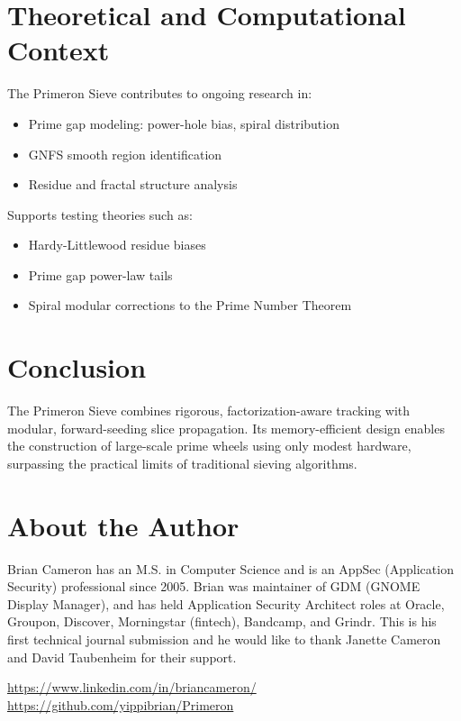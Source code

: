\section{Theoretical and Computational Context}

The Primeron Sieve contributes to ongoing research in:

\begin{itemize}
  \item Prime gap modeling: power-hole bias, spiral distribution
  \item GNFS smooth region identification
  \item Residue and fractal structure analysis
\end{itemize}

Supports testing theories such as:
\begin{itemize}
  \item Hardy-Littlewood residue biases
  \item Prime gap power-law tails
  \item Spiral modular corrections to the Prime Number Theorem
\end{itemize}

\section{Conclusion}
The Primeron Sieve combines rigorous, factorization-aware tracking with modular, forward-seeding slice propagation. Its memory-efficient design enables the construction of large-scale prime wheels using only modest hardware, surpassing the practical limits of traditional sieving algorithms.

\section*{About the Author}
Brian Cameron has an M.S. in Computer Science and is an AppSec (Application Security) professional since 2005. Brian was maintainer of GDM (GNOME Display Manager), and has held Application Security Architect roles at Oracle, Groupon, Discover, Morningstar (fintech), Bandcamp, and Grindr. This is his first technical journal submission and he would like to thank Janette Cameron and David Taubenheim for their support.

\noindent\href{https://www.linkedin.com/in/briancameron/}{https://www.linkedin.com/in/briancameron/} \\
\noindent\href{https://github.com/yippibrian/Primeron}{https://github.com/yippibrian/Primeron}
